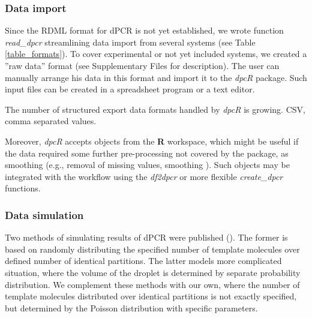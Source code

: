 \documentclass[a4,center,fleqn]{NAR}
\begin{document}
\subsubsection{Data import}

Since the RDML format for dPCR is not yet established, we wrote function 
\textit{read\_dpcr} streamlining data import from several systems (see Table 
\ref{table_formats}). To cover experimental or not yet included systems, we 
created a ''raw data'' format (see Supplementary Files for description). The 
user can manually arrange his data in this format and import it to the 
\textit{dpcR} package. Such input files can be created in a spreadsheet program 
or a text editor.

\begin{table}[b]
 {The number of structured export data formats handled by \textit{dpcR} is 
growing. CSV, comma separated values.}
\end{table}

Moreover, \textit{dpcR} accepts objects from the \textbf{R} workspace, which 
might be useful if the data required some further pre-processing not covered by 
the package, as smoothing (e.g., removal of missing values, smoothing 
\cite{spiess_impact_2015}). Such objects may be integrated with the 
workflow using the \textit{df2dpcr} or more flexible \textit{create\_dpcr} 
functions.


\subsubsection{Data simulation}

Two methods of simulating results of dPCR were published 
(\cite{dube_mathematical_2008, jacobs_2014}). The former is based on randomly 
distributing the specified number of template molecules over defined 
number of identical partitions. The latter models more complicated situation, 
where the volume of the droplet is determined by separate probability 
distribution. We complement these methods with our own, where the number of 
template molecules distributed over identical partitions is not exactly 
specified, but determined by the Poisson distribution with specific parameters.
\end{document}
